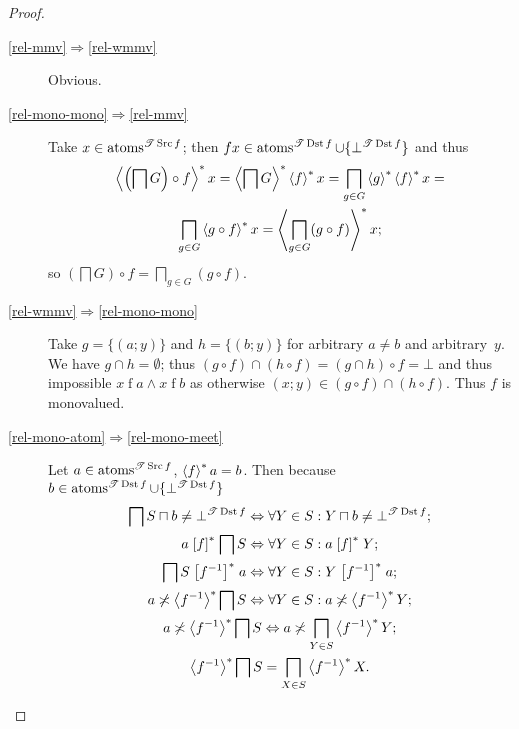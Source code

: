 \begin{proof}
~
\begin{description}
\item [{\ref{rel-mmv}$\Rightarrow$\ref{rel-wmmv}}] Obvious.
\item [{\ref{rel-mono-mono}$\Rightarrow$\ref{rel-mmv}}] Take $x\in\operatorname{atoms}^{\mathscr{T}\operatorname{Src} f}$;
then $fx\in\operatorname{atoms}^{\mathscr{T}\operatorname{Dst} f}\cup\{\bot^{\mathscr{T}\operatorname{Dst} f}\}$ and thus 
\begin{multline*}
\left\langle \left(\bigsqcap G\right)\circ f\right\rangle ^{\ast}x=\left\langle \bigsqcap G\right\rangle ^{\ast}\left\langle f\right\rangle ^{\ast}x=\bigsqcap_{g\in G}\left\langle g\right\rangle ^{\ast}\left\langle f\right\rangle ^{\ast}x=\\
\bigsqcap_{g\in G}\left\langle g\circ f\right\rangle ^{\ast}x=\left\langle \bigsqcap_{g\in G}(g\circ f)\right\rangle ^{\ast}x;
\end{multline*}
so $\left(\bigsqcap G\right)\circ f=\bigsqcap_{g\in G}(g\circ f)$.
\item [{\ref{rel-wmmv}$\Rightarrow$\ref{rel-mono-mono}}] Take $g=\{(a;y)\}$
and $h=\{(b;y)\}$ for arbitrary $a\ne b$ and arbitrary~$y$. We
have $g\cap h=\emptyset$; thus $(g\circ f)\cap(h\circ f)=(g\cap h)\circ f=\bot$
and thus impossible $x\mathrel fa\land x\mathrel fb$ as otherwise
$(x;y)\in(g\circ f)\cap(h\circ f)$. Thus $f$ is monovalued.
\item [{\ref{rel-mono-atom}$\Rightarrow$\ref{rel-mono-meet}}] Let $a\in\operatorname{atoms}^{\mathscr{T}\operatorname{Src} f}$,
$\left\langle f\right\rangle ^{\ast}a=b$. Then because $b\in\operatorname{atoms}^{\mathscr{T}\operatorname{Dst} f}\cup\{\bot^{\mathscr{T}\operatorname{Dst} f}\}$
\begin{gather*}
\bigsqcap S\sqcap b\ne\bot^{\mathscr{T}\operatorname{Dst} f}\Leftrightarrow\forall Y\in S:Y\sqcap b\ne\bot^{\mathscr{T}\operatorname{Dst} f};\\
a\mathrel{\left[f\right]^{\ast}}\bigsqcap S\Leftrightarrow\forall Y\in S:a\mathrel{\left[f\right]^{\ast}}Y;\\
\bigsqcap S\mathrel{\left[f^{-1}\right]^{\ast}}a\Leftrightarrow\forall Y\in S:Y\mathrel{\left[f^{-1}\right]^{\ast}}a;\\
a\not\asymp\left\langle f^{-1}\right\rangle ^{\ast}\bigsqcap S\Leftrightarrow\forall Y\in S:a\not\asymp\left\langle f^{-1}\right\rangle ^{\ast}Y;\\
a\not\asymp\left\langle f^{-1}\right\rangle ^{\ast}\bigsqcap S\Leftrightarrow a\not\asymp\bigsqcap_{Y\in S}\left\langle f^{-1}\right\rangle ^{\ast}Y;\\
\left\langle f^{-1}\right\rangle ^{\ast}\bigsqcap S=\bigsqcap_{X\in S}\left\langle f^{-1}\right\rangle ^{\ast}X.
\end{gather*}


\end{description}
\end{proof}
